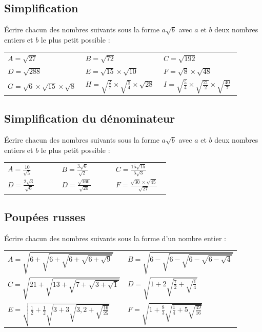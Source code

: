 \documentclass[oneside,12pt]{article}          %
\begin{document}
\subsection{Simplification}
Écrire chacun des nombres suivants sous la forme $a\sqrt{b}$ avec $a$ et $b$ deux nombres entiers et $b$ le plus petit possible :

\renewcommand{\arraystretch}{1.5}
\begin{tabular}{p{0.3\linewidth} p{0.3\linewidth} p{0.3\linewidth}}
    $A=\sqrt{27}$ & $B=\sqrt{72}$ & $C=\sqrt{192}$ \\
    $D=\sqrt{288}$ & $E=\sqrt{15}\times\sqrt{10}$ & $F=\sqrt{8}\times\sqrt{48}$ \\
    $G=\sqrt{6}\times\sqrt{15}\times\sqrt{8}$ & $ H=\sqrt{\frac{2}{7}}\times\sqrt{\frac{9}{4}}\times\sqrt{28}$ & $I=\sqrt{\frac{5}{4}}\times\sqrt{\frac{21}{2}}\times\sqrt{\frac{40}{7}}$
\end{tabular}



\subsection{Simplification du dénominateur}
Écrire chacun des nombres suivants sous la forme $a\sqrt{b}$ avec $a$ et $b$ deux nombres entiers et $b$ le plus petit possible :

\renewcommand{\arraystretch}{2}
\begin{tabular}{p{0.3\linewidth} p{0.3\linewidth} p{0.3\linewidth}}
    $A=\frac{10}{\sqrt{5}}$ & $B=\frac{3\sqrt{6}}{\sqrt{2}}$ & $C=\frac{15\sqrt{15}}{5\sqrt{3}}$ \\
    $D=\frac{2\sqrt{3}}{\sqrt{6}}$ & $D=\frac{\sqrt{160}}{\sqrt{20}}$ & $F=\frac{\sqrt{30}\times\sqrt{45}}{\sqrt{27}}$
\end{tabular}




\subsection{Poupées russes}
Écrire chacun des nombres suivants sous la forme d'un nombre entier :

\renewcommand{\arraystretch}{3.5}
\begin{tabular}{p{0.45\linewidth} p{0.45\linewidth}}
    $A=\sqrt{6+\sqrt{6+\sqrt{6+\sqrt{6+\sqrt{9}}}}}$ & $B=\sqrt{6-\sqrt{6-\sqrt{6-\sqrt{6-\sqrt{4}}}}}$ \\
    $C=\sqrt{21+\sqrt{13+\sqrt{7+\sqrt{3+\sqrt{1}}}}}$ & $D=\sqrt{1+2\sqrt{\frac{7}{2}+\sqrt{\frac{1}{4}}}}$ \\
    $E=\sqrt{\frac{1}{2}+\frac{1}{2}\sqrt{3+3\sqrt{3,2+\sqrt{\frac{16}{25}}}}}$ & $F=\sqrt{1+\frac{8}{3}\sqrt{\frac{1}{4}+5\sqrt{\frac{49}{16}}}}$
\end{tabular}
\end{document}
